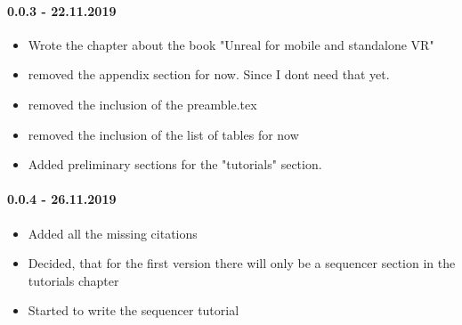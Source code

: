 \paragraph{0.0.3 - 22.11.2019}

\begin{itemize}
\item Wrote the chapter about the book "Unreal for mobile and standalone VR"
\item removed the appendix section for now. Since I dont need that yet.
\item removed the inclusion of the preamble.tex
\item removed the inclusion of the list of tables for now
\item Added preliminary sections for the "tutorials" section.
\end{itemize}


\paragraph{0.0.4 - 26.11.2019}

\begin{itemize}
\item Added all the missing citations
\item Decided, that for the first version there will only be a sequencer section in the tutorials chapter
\item Started to write the sequencer tutorial
\end{itemize}


